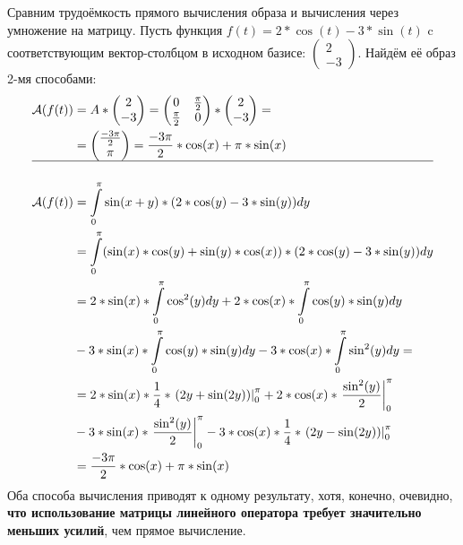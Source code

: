 \documentclass[12pt, a4paper]{article}
\begin{document}
Сравним трудоёмкость прямого вычисления образа и вычисления через умножение на матрицу. Пусть функция $f(t)=2*\cos(t)- 3*\sin(t)$ c соответствующим вектор-столбцом в исходном базисе: $\begin{pmatrix}
2\\
-3
\end{pmatrix}$. Найдём её образ 2-мя способами:
\begin{equation*}
\begin{aligned}
\mathcal{A}(f(t))&=A * \begin{pmatrix}
2\\
-3
\end{pmatrix} = \begin{pmatrix}
0 & \frac{\pi}{2}\\
\frac{\pi}{2} & 0\\
\end{pmatrix}
*\begin{pmatrix}
2\\
-3
\end{pmatrix} =\\
&=\begin{pmatrix}
\frac{-3\pi}{2}\\
\pi
\end{pmatrix} = \frac{-3\pi}{2}*\cos(x) + \pi * \sin(x)\\
\hline\\
\mathcal{A}(f(t)) &= \int\limits_{0}^{\pi} \sin(x+y)* (2*\cos(y)- 3*\sin(y)) dy\\
&= \int\limits_{0}^{\pi} (\sin(x)*\cos(y)+\sin(y)*\cos(x))* (2*\cos(y)- 3*\sin(y)) dy\\
&= 2*\sin(x)*\int\limits_{0}^{\pi} \cos^2(y)dy + 2*\cos(x)*\int\limits_{0}^{\pi} \cos(y)*\sin(y) dy \\
& - 3*\sin(x)*\int\limits_{0}^{\pi} \cos(y)*\sin(y) dy - 3*\cos(x)*\int\limits_{0}^{\pi} \sin^2(y) dy=\\
&=2*\sin(x)*\frac{1}{4}*\left.\left(2y+\sin(2y)\right)\right|_0^{\pi} + 2*\cos(x)*\left.\frac{\sin^2(y)}{2}\right|_0^{\pi}\\
& -3*\sin(x)*\left.\frac{\sin^2(y)}{2}\right|_0^{\pi}-3 * \cos(x) * \frac{1}{4}*\left.\left(2y-\sin(2y)\right)\right|_0^{\pi}\\
&=\frac{-3\pi}{2}*\cos(x) + \pi*\sin(x)
\end{aligned}
\end{equation*}
Оба способа вычисления приводят к одному результату, хотя, конечно, очевидно, \textbf{что   использование матрицы линейного оператора требует значительно меньших усилий}, чем прямое вычисление.
\end{document}
